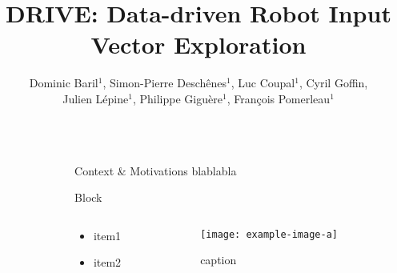 \documentclass[final,hyperref={pdfpagelabels=false}]{beamer}
\title{\huge DRIVE: Data-driven Robot Input Vector Exploration} %
\author{\normalsize Dominic Baril$^{1}$, Simon-Pierre Deschênes$^{1}$, Luc Coupal$^{1}$, Cyril Goffin, \\Julien Lépine$^{1}$, Philippe Giguère$^{1}$, François Pomerleau$^{1}$} %
\institute{\small$^1$ Northern Robotics Laboratory, Universit\'e Laval} %
\begin{document}

\begin{frame}[t] %

\begin{columns}[t] %

\begin{column}{.02\textwidth}\end{column} %

\begin{column}{.465\textwidth} %


\begin{block}{Context \& Motivations}
blablabla
\end{block}

\begin{block}{Block}
	\begin{columns} %
	\begin{column}{.58\textwidth} %
		\begin{itemize}
			\item item1
			\item item2 
		\end{itemize}
	\end{column}
	\begin{column}{.42\textwidth} %
		\centering
		\begin{figure}
			\texttt{[image: example-image-a]}
			\caption{caption}
		\end{figure}
	\end{column}
	\end{columns} %
\end{block}




\end{column}
\end{columns}
\end{frame}
\end{document}
